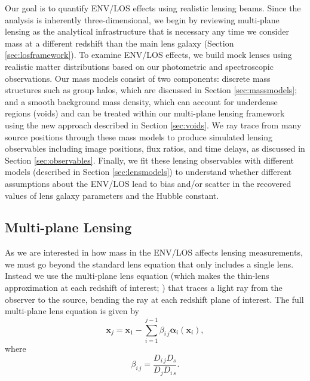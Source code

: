 \documentclass{emulateapj}
\newcommand\x[0]{\mathbf{x}}
\newcommand\al[0]{\boldsymbol{\alpha}}
\begin{document}
Our goal is to quantify ENV/LOS effects using realistic lensing beams. Since the analysis is inherently three-dimensional, we begin by reviewing multi-plane lensing as the analytical infrastructure that is necessary any time we consider mass at a different redshift than the main lens galaxy (Section \ref{sec:losframework}). To examine ENV/LOS effects, we build mock lenses using realistic matter distributions based on our photometric and spectroscopic observations. Our mass models consist of two components: discrete mass structures such as group halos, which are discussed in Section \ref{sec:massmodels}; and a smooth background mass density, which can account for underdense regions (voids) and can be treated within our multi-plane lensing framework using the new approach described in Section \ref{sec:voids}. We ray trace from many source positions through these mass models to produce simulated lensing observables including image positions, flux ratios, and time delays, as discussed in Section \ref{sec:observables}. Finally, we fit these lensing observables with different models (described in Section \ref{sec:lensmodels}) to understand whether different assumptions about the ENV/LOS lead to bias and/or scatter in the recovered values of lens galaxy parameters and the Hubble constant.

\subsection{Multi-plane Lensing\label{sec:losframework}}
As we are interested in how mass in the ENV/LOS affects lensing measurements, we must go beyond the standard lens equation that only includes a single lens. Instead we use the multi-plane lens equation (which makes the thin-lens approximation at each redshift of interest; \citealt{PLW}) that traces a light ray from the observer to the source, bending the ray at each redshift plane of interest. The full multi-plane lens equation is given by
\begin{equation}
\x_{j} = \x_1 - \sum_{i=1}^{j - 1} \beta_{i\,j} \al_i(\x_i),
\label{eqn:full_mp}
\end{equation}
where 
\begin{equation}
\beta_{i\,j} = \frac{D_{i\,j} D_s}{D_{j}D_{i\,s}}.
\end{equation}
\end{document}
